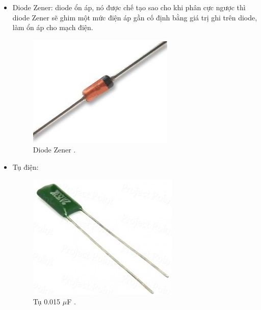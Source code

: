 \documentclass[a4paper,12pt,oneside]{article}
\begin{document}
\begin{enumerate}
\begin{itemize}
\item	Diode Zener: diode ổn áp, nó được chế tạo sao cho khi phân cực ngược thì diode Zener sẽ ghim một mức điện áp gần cố định bằng giá trị ghi trên diode, làm ổn áp cho mạch điện.
\begin{figure}[H]
\centering
\includegraphics[scale=.7]{hinh/PPM/ppm_zener.jpg}
\caption{Diode Zener \cite{dientuachau}.}
\end{figure}

\item	Tụ điện:
\begin{figure}[H]
\centering
\includegraphics[scale=.7]{hinh/PPM/ppm_c015.jpg}
\caption{Tụ 0.015 $\mu$F \cite{dientuachau}.}
\end{figure}


\end{itemize}
\end{enumerate}
\end{document}
